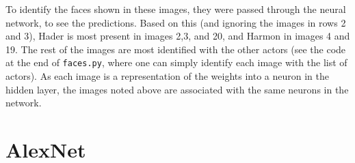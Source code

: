 \documentclass{article}
\begin{document}
   To identify the faces shown in these images, they were passed through the neural network, to see the predictions.
   Based on this (and ignoring the images in rows 2 and 3), Hader is most present in images 2,3, and 20,
   and Harmon in images 4 and 19. The rest of the images are most identified with the other actors (see
   the code at the end of \texttt{faces.py}, where one can simply identify each image with the list of actors).
   As each image is a representation of the weights into a neuron in the hidden layer, the images noted above
   are associated with the same neurons in the network.

   \section{AlexNet}
\end{document}
